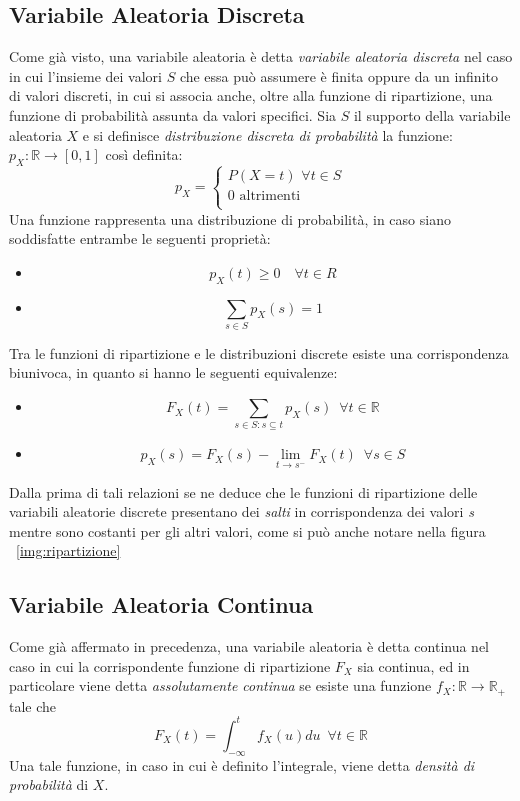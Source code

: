 \documentclass[a4paper,12pt, oneside]{book}
\newcommand{\numberset}{\mathbb}
\newcommand{\R}{\numberset{R}}
\begin{document}
\subsection{Variabile Aleatoria Discreta}
Come già visto, una variabile aleatoria è detta \emph{variabile aleatoria discreta} nel caso in cui l'insieme dei valori $S$
che essa può assumere  è finita oppure da un infinito di valori discreti, in cui si associa anche, oltre alla
funzione di ripartizione, una funzione di probabilità assunta da valori specifici.\newline
Sia $S$ il supporto della variabile aleatoria $X$ e si definisce \emph{distribuzione discreta di probabilità} la funzione:
$p_X:\R \to [0,1]$ così definita:
\[
    p_X = \begin{cases}
            P(X = t) \,\, \forall t \in S\\
            0        \,\, \mbox{altrimenti}\\
          \end{cases}\]
Una funzione rappresenta una distribuzione di probabilità, in caso siano soddisfatte entrambe le seguenti proprietà:
\begin{itemize}
    \item \[ p_X(t) \geq 0 \quad \forall t \in R \]
    \item \[ \sum _{s \in S} p_X(s) = 1 \]
\end{itemize}
Tra le funzioni di ripartizione e le distribuzioni discrete esiste una corrispondenza biunivoca, in quanto
si hanno le seguenti equivalenze:
\begin{itemize}
    \item \[F_X(t) = \sum _{s \in S:s \subseteq t} p_X(s)\,\,\, \forall t \in \R\]
    \item \[p_X(s) = F_X(s) - \lim _{t \to s^{-}} F_X(t)\,\,\, \forall s \in S\]
\end{itemize}
Dalla prima di tali relazioni se ne deduce che le funzioni di ripartizione delle variabili
aleatorie discrete presentano dei \textit{salti} in corrispondenza dei valori \textit{s} mentre
sono costanti per gli altri valori, come si può anche notare nella figura ~\ref{img:ripartizione}

\subsection{Variabile Aleatoria Continua}
Come già affermato in precedenza, una variabile aleatoria è detta continua nel caso in cui la 
corrispondente funzione di ripartizione $F_X$ sia continua, ed in particolare viene detta 
\emph{assolutamente continua} se esiste una funzione $f_X:\R \to \R_+$ tale che
\[F_X(t) = \int _{-\infty}^t f_X(u)du \,\,\, \forall t \in \R\]
Una tale funzione, in caso in cui è definito l'integrale, viene detta \emph{densità di probabilità }di $X$.
\end{document}
